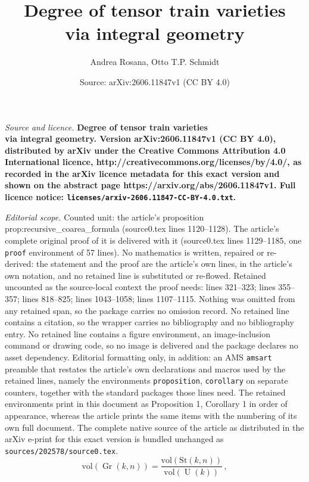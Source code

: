 \documentclass[10pt,a4paper]{amsart}
\title{\bf Degree of tensor train varieties \\ via integral geometry}
\author{Andrea Rosana, Otto T.P. Schmidt}
\date{Source: arXiv:2606.11847v1 (CC BY 4.0)}
\DeclareMathOperator{\Gr}{Gr}
\newcommand{\St}{\mathrm{St}}
\DeclareMathOperator{\U}{U}
\newcommand{\vol}{\mathrm{vol}}
\begin{document}
\maketitle

\noindent\emph{Source and licence.} \bf Degree of tensor train varieties \\ via integral geometry. Version arXiv:2606.11847v1 (CC BY 4.0), distributed by arXiv under the Creative Commons Attribution 4.0 International licence, http://creativecommons.org/licenses/by/4.0/, as recorded in the arXiv licence metadata for this exact version and shown on the abstract page https://arxiv.org/abs/2606.11847v1. Full licence notice: \texttt{licenses/arxiv-2606.11847-CC-BY-4.0.txt}.\par\smallskip

\noindent\textit{Editorial scope.} Counted unit: the article's proposition prop:recursive\_coarea\_formula (source0.tex lines 1120--1128). The article's complete original proof of it is delivered with it (source0.tex lines 1129--1185, one \texttt{proof} environment of 57 lines). No mathematics is written, repaired or re-derived: the statement and the proof are the article's own lines, in the article's own notation, and no retained line is substituted or re-flowed.  Retained uncounted as the source-local context the proof needs: lines 321--323; lines 355--357; lines 818--825; lines 1043--1058; lines 1107--1115.  Nothing was omitted from any retained span, so the package carries no omission record.  No retained line contains a citation, so the wrapper carries no bibliography and no bibliography entry.  No retained line contains a figure environment, an image-inclusion command or drawing code, so no image is delivered and the package declares no asset dependency.  Editorial formatting only, in addition: an AMS \texttt{amsart} preamble that restates the article's own declarations and macros used by the retained lines, namely the environments \texttt{proposition}, \texttt{corollary} on separate counters, together with the standard packages those lines need.  The retained environments print in this document as Proposition 1, Corollary 1 in order of appearance, whereas the article prints the same items with the numbering of its own full document.  The complete native source of the article as distributed in the arXiv e-print for this exact version is bundled unchanged as \texttt{sources/202578/source0.tex}.
\begin{equation}\label{eq:vol_gr}
    \vol(\Gr(k,n)) = \frac{\vol(\St(k,n))}{\vol(\U(k))}\,,
\end{equation}
\end{document}
